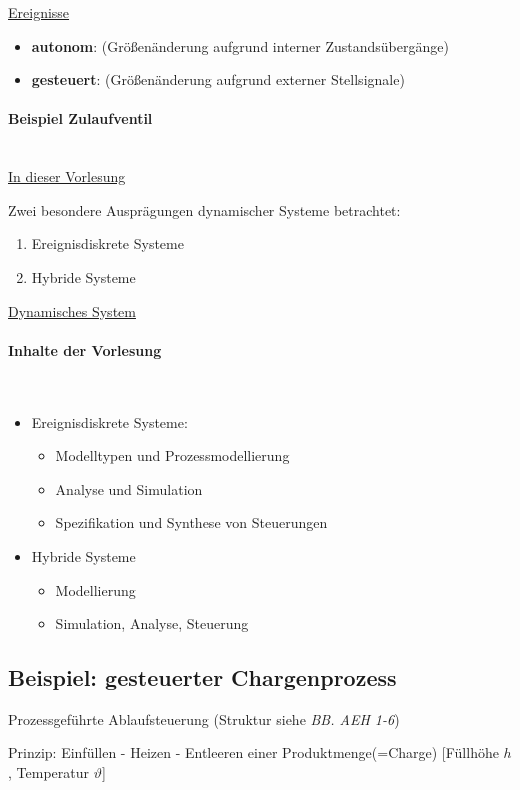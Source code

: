 \documentclass[12pt,a4paper]{scrartcl}
\numberwithin{equation}{section}
\newcommand{\properparagraph}[1]{\paragraph{#1}\mbox{}\\}
\begin{document}
\underline{Ereignisse}
\begin{itemize}
	\item \textbf{autonom}: (Größenänderung aufgrund interner Zustandsübergänge)
	\item \textbf{gesteuert}: (Größenänderung aufgrund externer Stellsignale)
\end{itemize}

\properparagraph{Beispiel Zulaufventil}


\underline{In dieser Vorlesung}

Zwei besondere Ausprägungen dynamischer Systeme betrachtet:
\begin{enumerate}
	\item Ereignisdiskrete Systeme
	\item Hybride Systeme 
\end{enumerate}

\underline{Dynamisches System}


\properparagraph{Inhalte der Vorlesung}

\begin{itemize}
	\item Ereignisdiskrete Systeme: 
	\begin{itemize}
		\item Modelltypen und Prozessmodellierung
		\item Analyse und Simulation
		\item Spezifikation und Synthese von Steuerungen
	\end{itemize}
	\item Hybride Systeme
	\begin{itemize}
		\item Modellierung
		\item Simulation, Analyse, Steuerung
	\end{itemize} 
\end{itemize}


\subsection{Beispiel: gesteuerter Chargenprozess}
Prozessgeführte Ablaufsteuerung (Struktur siehe \textit{BB. AEH 1-6})

Prinzip: Einfüllen - Heizen - Entleeren einer Produktmenge(=Charge) [Füllhöhe $h$, Temperatur $\vartheta$]
\end{document}
